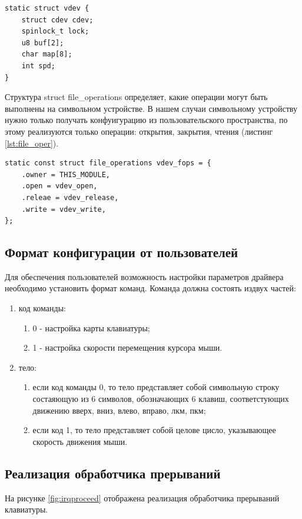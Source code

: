 \begin{lstlisting}[caption=Структура vdev, label={lst:vdev}]
static struct vdev {
	struct cdev cdev;
	spinlock_t lock;
	u8 buf[2];
	char map[8];
	int spd;
}
\end{lstlisting}

Структура struct file\_operations определяет, какие операции могут быть выполнены на символьном устройстве.
В нашем случаи символьному устройству нужно только получать конфуигурацию из пользовательского пространства, по этому реализуются только операции: открытия, закрытия, чтения (листинг \ref{lst:file_oper}).

\begin{lstlisting}[caption=Структура file\_operations, label=lst:file_oper]
static const struct file_operations vdev_fops = {
	.owner = THIS_MODULE,
	.open = vdev_open,
	.releae = vdev_release,
	.write = vdev_write,
};
\end{lstlisting}

\subsection{Формат конфигурации от пользователей}
Для обеспечения пользователей возможность настройки параметров драйвера необходимо установить формат команд. 
Команда должна состоять издвух частей:
\begin{enumerate}
	\item код команды: \begin{enumerate}
		\item 0 - настройка карты клавиатуры;
		\item 1 - настройка скорости перемещения курсора мыши.
	\end{enumerate}
	\item тело: \begin{enumerate}
		\item если код команды 0, то тело представляет собой символьную строку состаяющую из 6 символов, обозначающих 6 клавиш, соответстующих движению вверх, вниз, влево, вправо, лкм, пкм;
		\item если код 1, то тело представляет собой целове цисло, указывающее скорость движения мыши.
	\end{enumerate}
\end{enumerate}

\subsection{Реализация обработчика прерываний}
На рисунке \ref{fig:irqproceed} отображена реализация обработчика прерываний клавиатуры.

